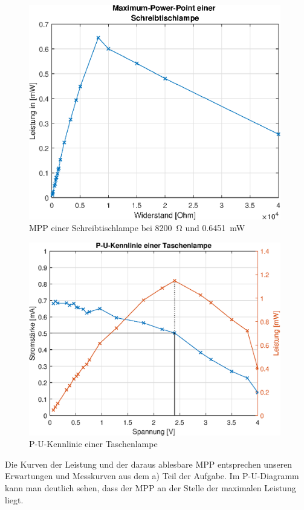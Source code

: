 \begin{figure}[htb]
\centering
\includegraphics[width=11cm]{pictures/MPP/Schreibtischlampe-MPP.eps}
\caption{MPP einer Schreibtischlampe bei \SI{8200}{\ohm} und \SI{0.6451}{\milli \watt}}
\label{fig:I_U_Schreibtischlampe}
\end{figure}

\clearpage
\begin{figure}[htb]
\centering
\includegraphics[width=11cm]{pictures/MPP/P-U-Kennlinie-Taschenlampe-MPP.eps}
\caption{P-U-Kennlinie einer Taschenlampe}
\label{fig:P-U-Kennlinie-Taschenlampe}
\end{figure}


Die Kurven der Leistung und der daraus ablesbare MPP entsprechen unseren Erwartungen und Messkurven aus dem a) Teil der Aufgabe.
Im P-U-Diagramm kann man deutlich sehen, dass der MPP an der Stelle der maximalen Leistung liegt.

